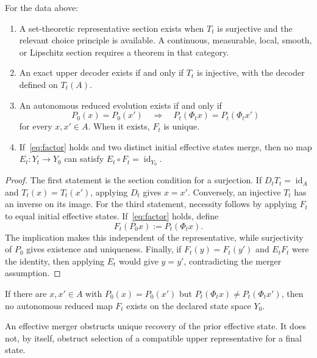 \documentclass[11pt]{article}
\begin{document}
\begin{theorem}\label{thm:typed}
For the data above:
\begin{enumerate}
\item A set-theoretic representative section exists when $T_t$ is surjective
and the relevant choice principle is available.  A continuous, measurable,
local, smooth, or Lipschitz section requires a theorem in that category.
\item An exact upper decoder exists if and only if $T_t$ is injective, with
the decoder defined on $T_t(A)$.
\item An autonomous reduced evolution exists if and only if
\begin{equation}
  P_0(x)=P_0(x')
  \quad\Longrightarrow\quad
  P_t(\Phi_t x)=P_t(\Phi_t x')
  \label{eq:factor}
\end{equation}
for every $x,x'\in A$.  When it exists, $F_t$ is unique.
\item If~\eqref{eq:factor} holds and two distinct initial effective states
merge, then no map $E_t:Y_t\to Y_0$ can satisfy
$E_t\circ F_t=\operatorname{id}_{Y_0}$.
\end{enumerate}
\end{theorem}

\begin{proof}
The first statement is the section condition for a surjection.  If
$D_tT_t=\operatorname{id}_A$ and $T_t(x)=T_t(x')$, applying $D_t$ gives
$x=x'$.  Conversely, an injective $T_t$ has an inverse on its image.  For the
third statement, necessity follows by applying $F_t$ to equal initial
effective states.  If~\eqref{eq:factor} holds, define
\[
  F_t(P_0x):=P_t(\Phi_tx).
\]
The implication makes this independent of the representative, while
surjectivity of $P_0$ gives existence and uniqueness.  Finally, if
$F_t(y)=F_t(y')$ and $E_tF_t$ were the identity, then applying $E_t$ would give
$y=y'$, contradicting the merger assumption.
\end{proof}

\begin{corollary}
If there are $x,x'\in A$ with $P_0(x)=P_0(x')$ but
$P_t(\Phi_tx)\ne P_t(\Phi_tx')$, then no autonomous reduced map $F_t$ exists
on the declared state space $Y_0$.
\end{corollary}

\begin{corollary}
An effective merger obstructs unique recovery of the prior effective state.
It does not, by itself, obstruct selection of a compatible upper
representative for a final state.
\end{corollary}
\end{document}
